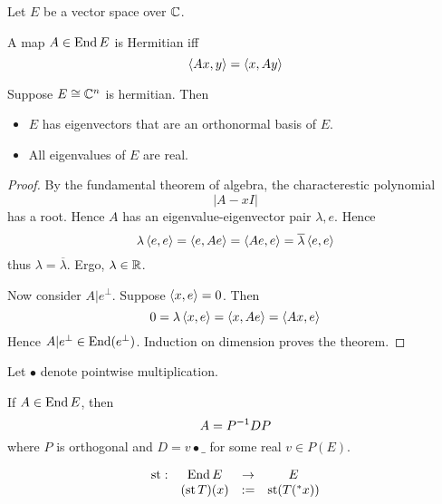 \documentclass{scrartcl}
\newcommand{\conj}[1]{\overline{#1}}
\newcommand{\hyper}[1]{\prescript{*}{}{#1}}
\renewcommand{\define}{:=}
\DeclareMathOperator{\st}{st}
\begin{document}
  Let $E$ be a vector space over $\mathbb{C}$. 
\begin{defn}[Hermitian]
  A map $A\in \operatorname{End}{E}$ is Hermitian iff
  \[
    \left\langle Ax, y \right\rangle=\left\langle x, Ay \right\rangle
  \]
\end{defn}
\begin{theorem}
  \label{finite-spectral-theorem}
  Suppose $E\cong \mathbb{C}^n$ is hermitian. Then
  \begin{itemize}
  \item $E$ has eigenvectors that are an orthonormal basis of $E$.
  \item All eigenvalues of $E$ are real. 
  \end{itemize}

\end{theorem}
\begin{proof}
  \renewcommand{\vec}{}
  By the fundamental theorem of algebra, the characterestic polynomial
  \[
    |A-xI|
  \]
  has a root. Hence $A$ has an eigenvalue-eigenvector pair $\lambda, \vec e$. Hence
  \[
    \lambda \inner{\vec e}{\vec e}=\inner{\vec e}{A \vec e}=\inner{A\vec e}{\vec e}=\conj\lambda \inner{\vec e}{\vec e}
  \]
  thus $\lambda = \conj\lambda$. Ergo, $\lambda\in \mathbb{R}$. 

  Now consider $A|e^\perp$. Suppose $\left\langle x, e \right\rangle=0$. Then 
  \[
    0=\lambda\left\langle x, e \right\rangle=\left\langle x, Ae \right\rangle=\left\langle Ax, e \right\rangle
  \]
  Hence $A|e^\perp\in\operatorname{End}(e^\perp)$. Induction on dimension proves the theorem. 
\end{proof}

Let $\bullet$ denote pointwise multiplication. 
\begin{cor}[diagonalization]
  \label{thm:diag}
  If $A\in\operatorname{End} E$, then 
  \[
    A=P^{-1}DP\\
  \]
  where $P$ is orthogonal and $D = v\bullet\_$ for some real $v\in P(E)$.
\end{cor}

\begin{defn}
  \[
  \begin{matrix}
   \st: &\End E &\to &E \\
    &(\st T)(x) &\define& \st( T(\hyper x))
  \end{matrix}
  \]
\end{defn}
\end{document}
